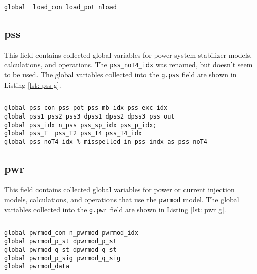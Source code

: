 \begin{lstlisting}[caption={Non-Conforming Load Global Field Variables},label={lst: ncl g}]
\end{lstlisting}\vspace{-2 em}
\begin{verbatim}
global  load_con load_pot nload
\end{verbatim}

\subsection{pss}
This field contains collected global variables for power system stabilizer models, calculations, and operations.
The \verb|pss_noT4_idx| was renamed, but doesn't seem to be used.
The global variables collected into the \verb|g.pss| field are shown in Listing \ref{lst: pss g}.

\begin{lstlisting}[caption={PSS Global Field Variables},label={lst: pss g}]
\end{lstlisting}\vspace{-2 em}
\begin{verbatim}
global pss_con pss_pot pss_mb_idx pss_exc_idx
global pss1 pss2 pss3 dpss1 dpss2 dpss3 pss_out
global pss_idx n_pss pss_sp_idx pss_p_idx;
global pss_T  pss_T2 pss_T4 pss_T4_idx  
global pss_noT4_idx % misspelled in pss_indx as pss_noT4
\end{verbatim}



\subsection{pwr}
This field contains collected global variables for power or current injection models, calculations, and operations that use the \verb|pwrmod| model.
The global variables collected into the \verb|g.pwr| field are shown in Listing \ref{lst: pwr g}.

\begin{lstlisting}[caption={PWRMOD Global Field Variables},label={lst: pwr g}]
\end{lstlisting}\vspace{-2 em}
\begin{verbatim}
global pwrmod_con n_pwrmod pwrmod_idx
global pwrmod_p_st dpwrmod_p_st
global pwrmod_q_st dpwrmod_q_st
global pwrmod_p_sig pwrmod_q_sig
global pwrmod_data
\end{verbatim}

